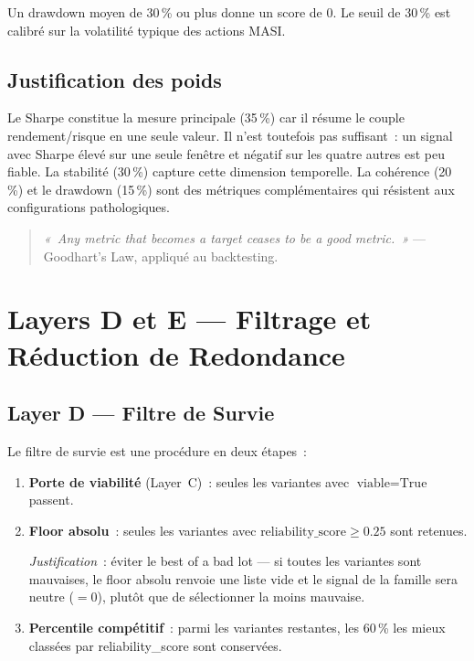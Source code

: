 Un drawdown moyen de 30\,\% ou plus donne un score de 0. Le seuil de 30\,\% est
calibré sur la volatilité typique des actions MASI.

\subsection{Justification des poids}

Le Sharpe constitue la mesure principale (35\,\%) car il résume le couple rendement/risque
en une seule valeur. Il n'est toutefois pas suffisant~: un signal avec Sharpe élevé sur
une seule fenêtre et négatif sur les quatre autres est peu fiable. La stabilité (30\,\%)
capture cette dimension temporelle. La cohérence (20\,\%) et le drawdown (15\,\%) sont
des métriques complémentaires qui résistent aux configurations pathologiques.

\begin{quote}
\textit{«~Any metric that becomes a target ceases to be a good metric.~»}
— Goodhart's Law, appliqué au backtesting.
\end{quote}

\section{Layers D et E --- Filtrage et Réduction de Redondance}
\label{sec:layers_de}

\subsection{Layer D — Filtre de Survie}

Le filtre de survie est une procédure en deux étapes~:

\begin{enumerate}
    \item \textbf{Porte de viabilité} (Layer~C)~: seules les variantes avec
    $\text{viable} = \text{True}$ passent.

    \item \textbf{Floor absolu}~: seules les variantes avec
    $\text{reliability\_score} \geq 0.25$ sont retenues.

    \textit{Justification}~: éviter le \og best of a bad lot \fg{} — si toutes les
    variantes sont mauvaises, le floor absolu renvoie une liste vide et le signal de
    la famille sera neutre ($= 0$), plutôt que de sélectionner la moins mauvaise.

    \item \textbf{Percentile compétitif}~: parmi les variantes restantes, les 60\,\%
    les mieux classées par reliability\_score sont conservées.
\end{enumerate}

